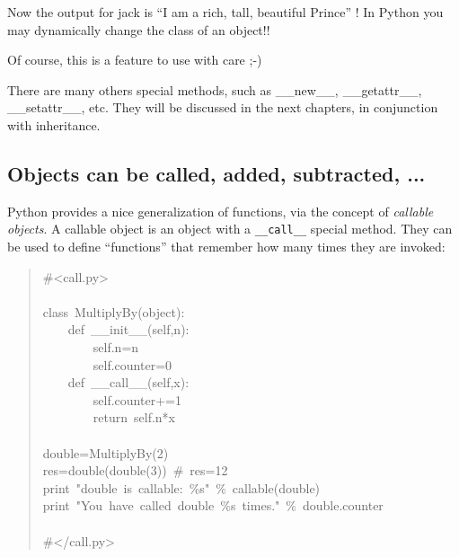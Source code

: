 \documentclass[10pt,english]{article}
\begin{document}
Now the output for jack is ``I am a rich, tall, beautiful Prince'' !
In Python you may dynamically change the class of an object!!

Of course, this is a feature to use with care ;-)

There are many others special methods, such as {\_}{\_}new{\_}{\_}, {\_}{\_}getattr{\_}{\_},
{\_}{\_}setattr{\_}{\_}, etc. They will be discussed in the next chapters, in
conjunction with inheritance.



\hypertarget{objects-can-be-called-added-subtracted}{}
\subsection*{Objects can be called, added, subtracted, ...}

Python provides a nice generalization of functions, via the concept
of \emph{callable objects}. A callable object is an object with a \texttt{{\_}{\_}call{\_}{\_}}
special method. They can be used to define ``functions'' that remember
how many times they are invoked:
\begin{quote}
\begin{ttfamily}\begin{flushleft}
\mbox{{\#}<call.py>}\\
\mbox{}\\
\mbox{class~MultiplyBy(object):}\\
\mbox{~~~~def~{\_}{\_}init{\_}{\_}(self,n):}\\
\mbox{~~~~~~~~self.n=n}\\
\mbox{~~~~~~~~self.counter=0}\\
\mbox{~~~~def~{\_}{\_}call{\_}{\_}(self,x):}\\
\mbox{~~~~~~~~self.counter+=1}\\
\mbox{~~~~~~~~return~self.n*x}\\
\mbox{}\\
\mbox{double=MultiplyBy(2)}\\
\mbox{res=double(double(3))~{\#}~res=12}\\
\mbox{print~"double~is~callable:~{\%}s"~{\%}~callable(double)}\\
\mbox{print~"You~have~called~double~{\%}s~times."~{\%}~double.counter}\\
\mbox{}\\
\mbox{{\#}</call.py>}
\end{flushleft}\end{ttfamily}
\end{quote}
\end{document}
